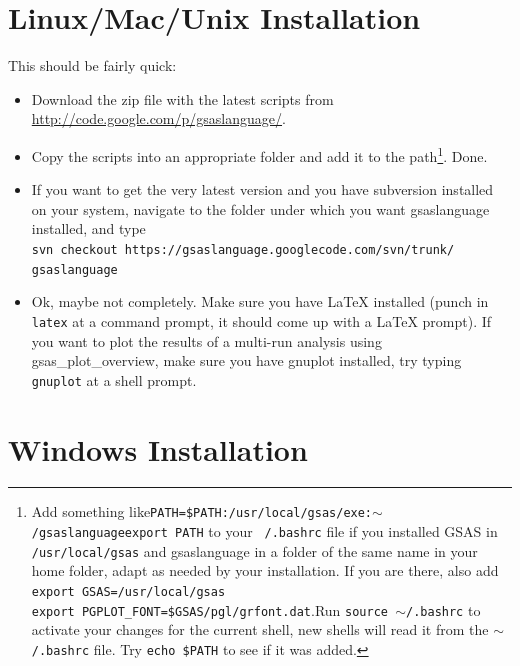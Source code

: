 \section{Linux/Mac/Unix Installation}
This should be fairly quick:
\begin{itemize}
\item Download the zip file with the latest scripts from \url{http://code.google.com/p/gsaslanguage/}. 
\item Copy the scripts into an appropriate folder and add it to the path\footnote{Add something like\newline \texttt{PATH=\$PATH:/usr/local/gsas/exe:$\sim$/gsaslanguage\newline export PATH\newline} to your \texttt{~/.bashrc} file if you installed GSAS in \texttt{/usr/local/gsas} and gsaslanguage in a folder of the same name in your home folder, adapt as needed by your installation. If you are there, also add \texttt{\\export GSAS=/usr/local/gsas \\export PGPLOT\_FONT=\$GSAS/pgl/grfont.dat}.Run \texttt{source $\sim$/.bashrc} to activate your changes for the current shell, new shells will read it from the \texttt{$\sim$/.bashrc} file. Try \texttt{echo \$PATH} to see if it was added.}. Done.
\item If you want to get the very latest version and you have subversion
installed on your system, navigate to the folder under which you want
gsaslanguage installed, and type\\
\texttt{svn checkout https://gsaslanguage.googlecode.com/svn/trunk/
gsaslanguage}
\item Ok, maybe not completely. Make sure you have \LaTeX{}  installed (punch in \texttt{latex} at a command prompt, it should come up with a \LaTeX{}  prompt). If you want to plot the results of a multi-run analysis using gsas\_plot\_overview, make sure you have gnuplot installed, try typing \texttt{gnuplot} at a shell prompt.
\end{itemize}

\section{Windows Installation}

